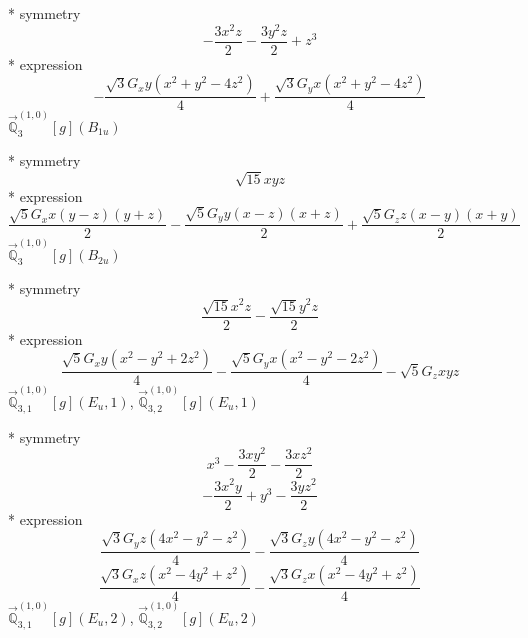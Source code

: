 \documentclass[fleqn,8pt]{jsarticle}
\begin{document}
\noindent\quad ** symmetry
\begin{dmath*}
- \frac{3 x^{2} z}{2} - \frac{3 y^{2} z}{2} + z^{3}
\end{dmath*}
\noindent\quad ** expression
\begin{dmath*}
- \frac{\sqrt{3} G_{x} y \left(x^{2} + y^{2} - 4 z^{2}\right)}{4} + \frac{\sqrt{3} G_{y} x \left(x^{2} + y^{2} - 4 z^{2}\right)}{4}
\end{dmath*}
\noindent\quad $\vec{\mathbb{Q}}_{3}^{(1,0)}[g](B_{1u})$

\noindent\quad ** symmetry
\begin{dmath*}
\sqrt{15} x y z
\end{dmath*}
\noindent\quad ** expression
\begin{dmath*}
\frac{\sqrt{5} G_{x} x \left(y - z\right) \left(y + z\right)}{2} - \frac{\sqrt{5} G_{y} y \left(x - z\right) \left(x + z\right)}{2} + \frac{\sqrt{5} G_{z} z \left(x - y\right) \left(x + y\right)}{2}
\end{dmath*}
\noindent\quad $\vec{\mathbb{Q}}_{3}^{(1,0)}[g](B_{2u})$

\noindent\quad ** symmetry
\begin{dmath*}
\frac{\sqrt{15} x^{2} z}{2} - \frac{\sqrt{15} y^{2} z}{2}
\end{dmath*}
\noindent\quad ** expression
\begin{dmath*}
\frac{\sqrt{5} G_{x} y \left(x^{2} - y^{2} + 2 z^{2}\right)}{4} - \frac{\sqrt{5} G_{y} x \left(x^{2} - y^{2} - 2 z^{2}\right)}{4} - \sqrt{5} G_{z} x y z
\end{dmath*}
\noindent\quad $\vec{\mathbb{Q}}_{3,1}^{(1,0)}[g](E_{u},1)$, $\vec{\mathbb{Q}}_{3,2}^{(1,0)}[g](E_{u},1)$

\noindent\quad ** symmetry
\begin{dmath*}
x^{3} - \frac{3 x y^{2}}{2} - \frac{3 x z^{2}}{2}
\end{dmath*}
\begin{dmath*}
- \frac{3 x^{2} y}{2} + y^{3} - \frac{3 y z^{2}}{2}
\end{dmath*}
\noindent\quad ** expression
\begin{dmath*}
\frac{\sqrt{3} G_{y} z \left(4 x^{2} - y^{2} - z^{2}\right)}{4} - \frac{\sqrt{3} G_{z} y \left(4 x^{2} - y^{2} - z^{2}\right)}{4}
\end{dmath*}
\begin{dmath*}
\frac{\sqrt{3} G_{x} z \left(x^{2} - 4 y^{2} + z^{2}\right)}{4} - \frac{\sqrt{3} G_{z} x \left(x^{2} - 4 y^{2} + z^{2}\right)}{4}
\end{dmath*}
\noindent\quad $\vec{\mathbb{Q}}_{3,1}^{(1,0)}[g](E_{u},2)$, $\vec{\mathbb{Q}}_{3,2}^{(1,0)}[g](E_{u},2)$
\end{document}
